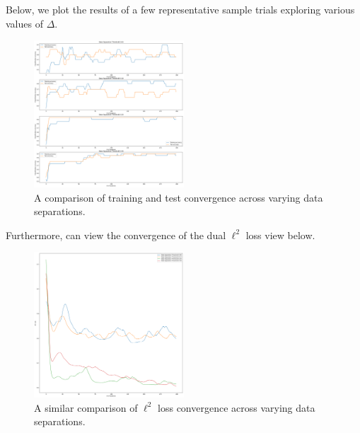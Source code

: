 \documentclass{beamer}
\newcommand\0{\mathbf{0}}
\newcommand\<{\langle}
\renewcommand\>{\rangle}
\begin{document}
\begin{frame}
Below, we plot the results of a few representative sample trials exploring various values of $\Delta$.

\begin{figure}[H]
\includegraphics[width=0.5\textwidth]{images/data_sep}
\caption{A comparison of training and test convergence across varying data separations.}
\end{figure}
\end{frame}

\begin{frame}
Furthermore, can view the convergence of the dual $\ell^2$ loss view below.

\begin{figure}[H]
\centering
\includegraphics[width=0.5\textwidth]{images/l2_loss_conv}	
\caption{A similar comparison of $\ell^2$ loss convergence across varying data separations.}
\end{figure}
\end{frame}
\end{document}

